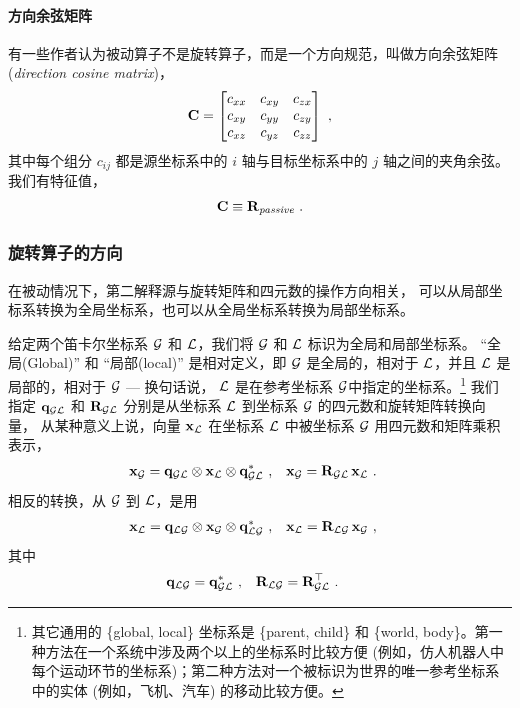 \paragraph{方向余弦矩阵}
有一些作者认为被动算子不是旋转算子，而是一个方向规范，叫做方向余弦矩阵(\emph{direction cosine matrix})，
%
\begin{align}
{\bf C} = \begin{bmatrix}
c_{xx} & c_{xy} & c_{zx} \\
c_{xy} & c_{yy} & c_{zy} \\
c_{xz} & c_{yz} & c_{zz} 
\end{bmatrix}
~,
\end{align}
%
其中每个组分 $c_{ij}$ 都是源坐标系中的 $i$ 轴与目标坐标系中的 $j$ 轴之间的夹角余弦。我们有特征值，
%
\begin{align}
{\bf C} \equiv {\bf R}_{\textit{passive}}
~.
\end{align}


\subsubsection{旋转算子的方向}

在被动情况下，第二解释源与旋转矩阵和四元数的操作方向相关， 
可以从局部坐标系转换为全局坐标系，也可以从全局坐标系转换为局部坐标系。 

给定两个笛卡尔坐标系 $\mathcal{G}$ 和 $\mathcal{L}$，我们将 $\mathcal{G}$ 和 $\mathcal{L}$ 标识为全局和局部坐标系。
``全局(Global)'' 和 ``局部(local)'' 是相对定义，即 $\mathcal{G}$ 是全局的，相对于 $\mathcal{L}$，并且 $\mathcal{L}$ 是局部的，相对于 $\mathcal{G}$ --- 换句话说， $\mathcal{L}$ 是在参考坐标系 $\mathcal{G}$中指定的坐标系。\footnote{其它通用的 \{global, local\} 坐标系是 \{parent, child\} 和 \{world, body\}。第一种方法在一个系统中涉及两个以上的坐标系时比较方便 (例如，仿人机器人中每个运动环节的坐标系)；第二种方法对一个被标识为世界的唯一参考坐标系中的实体 (例如，飞机、汽车) 的移动比较方便。} 
我们指定 ${\bf q}_{\mathcal{G}\mathcal{L}}$ 和 ${\bf R}_{\mathcal{G}\mathcal{L}}$ 分别是从坐标系 $\mathcal{L}$ 到坐标系 $\mathcal{G}$ 的四元数和旋转矩阵转换向量， 
从某种意义上说，向量 ${\bf x}_{\mathcal{L}}$ 在坐标系 $\mathcal{L}$ 中被坐标系 $\mathcal{G}$ 用四元数和矩阵乘积表示，
%
\begin{align}
{\bf x}_{\mathcal{G}} &= {\bf q}_{\mathcal{G}\mathcal{L}}\otimes{\bf x}_{\mathcal{L}}\otimes{\bf q}_{\mathcal{G}\mathcal{L}}^*~, &
{\bf x}_{\mathcal{G}} &= {\bf R}_{\mathcal{G}\mathcal{L}}\,{\bf x}_{\mathcal{L}}~.
\label{equ:local_to_global}
\end{align}
%
相反的转换，从 $\mathcal{G}$ 到 $\mathcal{L}$，是用
%
\begin{align}
{\bf x}_{\mathcal{L}} &= {\bf q}_{\mathcal{L}\mathcal{G}}\otimes{\bf x}_{\mathcal{G}}\otimes{\bf q}_{\mathcal{L}\mathcal{G}}^*
~,
&
{\bf x}_{\mathcal{L}} &= {\bf R}_{\mathcal{L}\mathcal{G}}\,{\bf x}_{\mathcal{G}}~,
\end{align}
%
其中
%
\begin{align}
{\bf q}_{\mathcal{L}\mathcal{G}} &= {\bf q}_{\mathcal{G}\mathcal{L}}^*~,
& 
{\bf R}_{\mathcal{L}\mathcal{G}} &= {\bf R}_{\mathcal{G}\mathcal{L}}^{\top}~. \label{equ:localVsGlobal}
\end{align}


